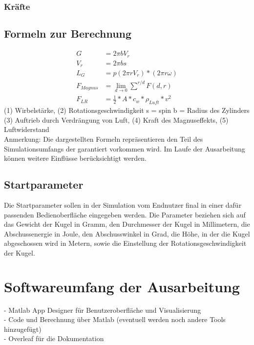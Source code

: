 \documentclass{scrartcl}
\begin{document}
\subsubsection{Kräfte}

\subsection{Formeln zur Berechnung}

\begin{align}
    G&=2 \pi b V_{r}    \\
    V_{r}&=2 \pi b s \\
    L_{G}&= p(2 \pi r V_{r})*(2 \pi r \omega ) \\
    F_{Magnus}&= \lim \limits_{d \to 0} \sum\limits_{}^{r/d} F(d,r) \\
    F_{LR}&= \frac{1}{2} *A*c_{w}* \rho_{Luft}*v^2
\end{align}
(1) Wirbelstärke, (2) Rotationsgeschwindigkeit s = spin b = Radius des Zylinders\\
(3) Auftrieb durch Verdrängung von Luft, (4) Kraft des Magnuseffekts, (5) Luftwiderstand \\
Anmerkung: Die dargestellten Formeln repräsentieren den Teil des Simulationsumfangs der garantiert vorkommen wird. Im Laufe der Ausarbeitung können weitere Einflüsse berücksichtigt werden.

\subsection{Startparameter}

Die Startparameter sollen in der Simulation vom Endnutzer final in einer dafür passenden Bedienoberfläche eingegeben werden. 
Die Parameter beziehen sich auf das Gewicht der Kugel in Gramm, den Durchmesser der Kugel in Millimetern, die Abschussenergie in Joule, den Abschusswinkel in Grad, die Höhe, in der die Kugel abgeschossen wird in Metern, sowie die Einstellung der Rotationsgeschwindigkeit der Kugel.

\section{Softwareumfang der Ausarbeitung}

- Matlab App Designer für Benutzeroberfläche und Visualisierung\\
- Code und Berechnung über Matlab (eventuell werden noch andere Tools hinzugefügt)\\
- Overleaf für die Dokumentation

\centering
\end{document}
